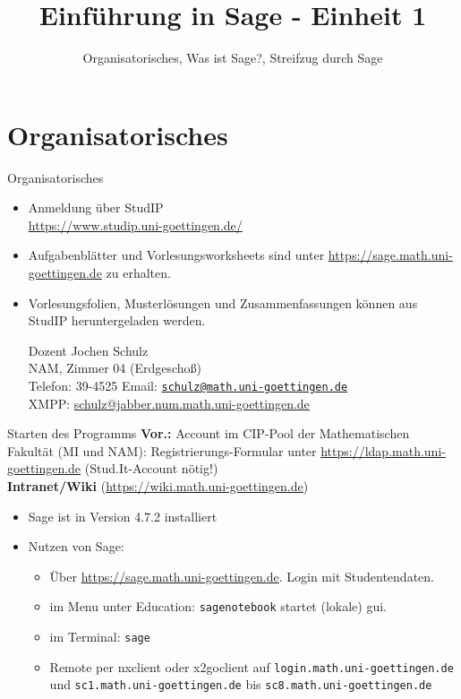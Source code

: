 \documentclass[notes=hide,hyperref={dvipdfmx,pdfpagelabels=false}]{beamer}
\title{Einführung in Sage - Einheit 1}
\subtitle{Organisatorisches, Was ist Sage?, Streifzug durch Sage}
\begin{document}
\maketitle

\section*{Organisatorisches}

\begin{frame}{Organisatorisches}
\begin{itemize}
\item Anmeldung über StudIP \\
      \url{https://www.studip.uni-goettingen.de/}

{\color{blue}{Einführung in Sage (Mathematische Anwendersysteme) (WS 2011/2012)}}
\item Aufgabenblätter und  Vorlesungsworksheets sind unter \url{https://sage.math.uni-goettingen.de} zu erhalten.
\item Vorlesungsfolien, Musterlösungen und Zusammenfassungen können aus StudIP heruntergeladen werden. 
\pause
\begin{block}{Dozent}
Jochen Schulz\\
NAM, Zimmer 04 (Erdgescho{\ss})\\
Telefon: 39-4525
Email: \href{mailto:schulz@math.uni-goettingen.de}{\texttt{schulz@math.uni-goettingen.de}}\\
XMPP: \url{schulz@jabber.num.math.uni-goettingen.de}\\

\end{block}
\end{itemize}
\end{frame}

\begin{frame}{Starten des Programms}
\textbf{Vor.:} Account im CIP-Pool der Mathematischen Fakultät (MI und NAM): Registrierungs-Formular unter \url{https://ldap.math.uni-goettingen.de} (\alert{Stud.It-Account} nötig!)\\
\textbf{Intranet/Wiki} (\url{https://wiki.math.uni-goettingen.de})
\begin{itemize}
\item Sage ist in Version 4.7.2 installiert
\item Nutzen von Sage: 
\begin{itemize}
\item Über \url{https://sage.math.uni-goettingen.de}. Login mit Studentendaten.
\item im Menu unter Education: \texttt{sagenotebook} startet (lokale) gui.\\
\item im Terminal: \texttt{sage}
\item Remote per \alert{nxclient} oder \alert{x2goclient}
auf \texttt{login.math.uni-goettingen.de} und \texttt{sc1.math.uni-goettingen.de} bis 
\texttt{sc8.math.uni-goettingen.de}
\end{itemize}
\end{itemize}
\end{frame}
\end{document}
